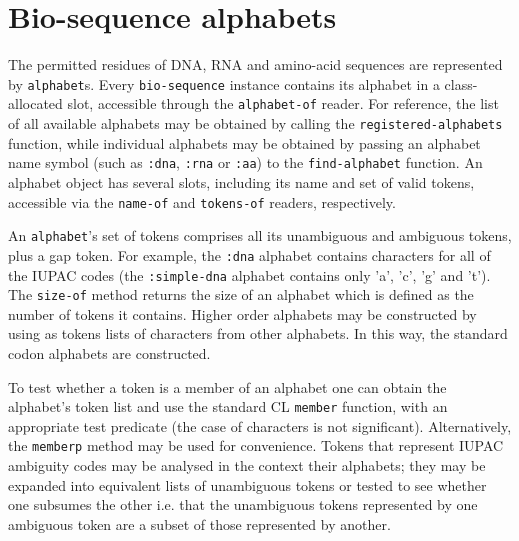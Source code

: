 \documentclass[a4paper, 12pt]{article}
\begin{document}
\section{Bio-sequence alphabets}
\label{sec:alphabet-bioseq}

The permitted residues of DNA, RNA and amino-acid sequences are
represented by \lstinline!alphabet!s. Every \lstinline!bio-sequence!
instance contains its alphabet in a class-allocated slot, accessible
through the \lstinline!alphabet-of! reader. For reference, the list of
all available alphabets may be obtained by calling the
\lstinline!registered-alphabets! function, while individual alphabets
may be obtained by passing an alphabet name symbol (such as
\lstinline!:dna!, \lstinline!:rna! or \lstinline!:aa!) to the
\lstinline!find-alphabet! function. An alphabet object has several
slots, including its name and set of valid tokens, accessible via the
\lstinline!name-of! and \lstinline!tokens-of! readers, respectively.

An \lstinline!alphabet!'s set of tokens comprises all its unambiguous
and ambiguous tokens, plus a gap token. For example, the
\lstinline!:dna! alphabet contains characters for all of the IUPAC
codes (the \lstinline!:simple-dna! alphabet contains only 'a', 'c',
'g' and 't'). The \lstinline!size-of! method returns the size of an
alphabet which is defined as the number of tokens it contains. Higher
order alphabets may be constructed by using as tokens lists of
characters from other alphabets. In this way, the standard codon
alphabets are constructed.

To test whether a token is a member of an alphabet one can obtain the
alphabet's token list and use the standard CL \lstinline!member!
function, with an appropriate test predicate (the case of characters
is not significant). Alternatively, the \lstinline!memberp! method may
be used for convenience. Tokens that represent IUPAC ambiguity codes
may be analysed in the context their alphabets; they may be expanded
into equivalent lists of unambiguous tokens or tested to see whether
one subsumes the other i.e. that the unambiguous tokens represented by
one ambiguous token are a subset of those represented by another.
\end{document}
